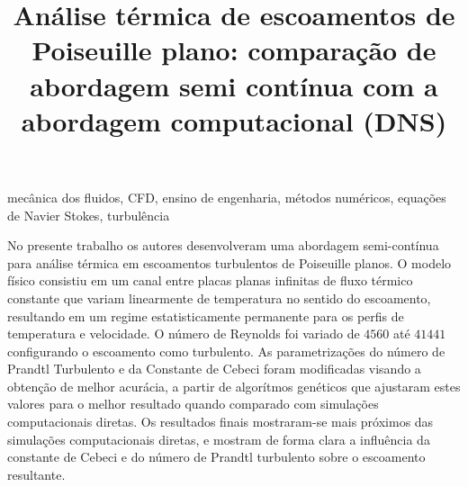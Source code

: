 \documentclass[dissertmst]{ppgco}
\title{Análise térmica de escoamentos de Poiseuille plano: comparação de abordagem semi contínua com a abordagem computacional (DNS)}
\begin{document}
\pretextual

\maketitle



\begin{resumo}{mecânica dos fluidos, CFD, ensino de engenharia, métodos numéricos, equações de Navier Stokes, turbulência}


No presente trabalho os autores desenvolveram uma abordagem semi-contínua para análise térmica em escoamentos turbulentos de Poiseuille planos. O modelo físico consistiu em um canal entre placas planas infinitas de fluxo térmico constante que variam linearmente de temperatura no sentido do escoamento, resultando em um regime estatisticamente permanente para os perfis de temperatura e velocidade. O número de Reynolds foi variado de $4560$ até $41441$ configurando o escoamento como turbulento. As parametrizações do número de Prandtl Turbulento e da Constante de Cebeci foram modificadas visando a obtenção de melhor acurácia, a partir de algorítmos genéticos que ajustaram estes valores para o melhor resultado quando comparado com simulações computacionais diretas. Os resultados finais mostraram-se mais próximos das simulações computacionais diretas, e mostram de forma clara a influência da constante de Cebeci e do número de Prandtl turbulento sobre o escoamento resultante.

\end{resumo}
\end{document}
